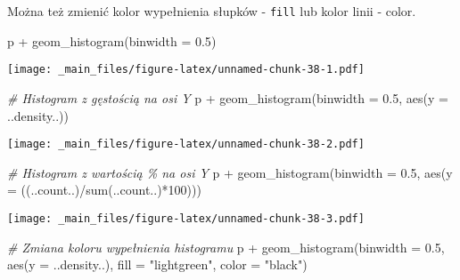 \documentclass[
]{book}
\newenvironment{Shaded}{\begin{snugshade}}{\end{snugshade}}
\newcommand{\AttributeTok}[1]{\textcolor[rgb]{0.77,0.63,0.00}{#1}}
\newcommand{\CommentTok}[1]{\textcolor[rgb]{0.56,0.35,0.01}{\textit{#1}}}
\newcommand{\DecValTok}[1]{\textcolor[rgb]{0.00,0.00,0.81}{#1}}
\newcommand{\FloatTok}[1]{\textcolor[rgb]{0.00,0.00,0.81}{#1}}
\newcommand{\FunctionTok}[1]{\textcolor[rgb]{0.00,0.00,0.00}{#1}}
\newcommand{\NormalTok}[1]{#1}
\newcommand{\SpecialCharTok}[1]{\textcolor[rgb]{0.00,0.00,0.00}{#1}}
\newcommand{\StringTok}[1]{\textcolor[rgb]{0.31,0.60,0.02}{#1}}
\begin{document}
Można też zmienić kolor wypełnienia słupków - \texttt{fill} lub kolor linii - color.

\begin{Shaded}
\begin{Highlighting}[]
\NormalTok{p }\SpecialCharTok{+} \FunctionTok{geom\_histogram}\NormalTok{(}\AttributeTok{binwidth =} \FloatTok{0.5}\NormalTok{)}
\end{Highlighting}
\end{Shaded}

\texttt{[image: \_main\_files/figure-latex/unnamed-chunk-38-1.pdf]}

\begin{Shaded}
\begin{Highlighting}[]
\CommentTok{\# Histogram z gęstością na osi Y}
\NormalTok{p }\SpecialCharTok{+} \FunctionTok{geom\_histogram}\NormalTok{(}\AttributeTok{binwidth =} \FloatTok{0.5}\NormalTok{, }\FunctionTok{aes}\NormalTok{(}\AttributeTok{y =}\NormalTok{ ..density..))}
\end{Highlighting}
\end{Shaded}

\texttt{[image: \_main\_files/figure-latex/unnamed-chunk-38-2.pdf]}

\begin{Shaded}
\begin{Highlighting}[]
\CommentTok{\# Histogram z wartością \% na osi Y}
\NormalTok{p }\SpecialCharTok{+} \FunctionTok{geom\_histogram}\NormalTok{(}\AttributeTok{binwidth =} \FloatTok{0.5}\NormalTok{, }\FunctionTok{aes}\NormalTok{(}\AttributeTok{y =}\NormalTok{ ((..count..)}\SpecialCharTok{/}\FunctionTok{sum}\NormalTok{(..count..)}\SpecialCharTok{*}\DecValTok{100}\NormalTok{)))}
\end{Highlighting}
\end{Shaded}

\texttt{[image: \_main\_files/figure-latex/unnamed-chunk-38-3.pdf]}

\begin{Shaded}
\begin{Highlighting}[]
\CommentTok{\# Zmiana koloru wypełnienia histogramu}
\NormalTok{p }\SpecialCharTok{+} \FunctionTok{geom\_histogram}\NormalTok{(}\AttributeTok{binwidth =} \FloatTok{0.5}\NormalTok{, }\FunctionTok{aes}\NormalTok{(}\AttributeTok{y =}\NormalTok{ ..density..), }
                   \AttributeTok{fill =} \StringTok{"lightgreen"}\NormalTok{, }\AttributeTok{color =} \StringTok{"black"}\NormalTok{)}
\end{Highlighting}
\end{Shaded}
\end{document}

